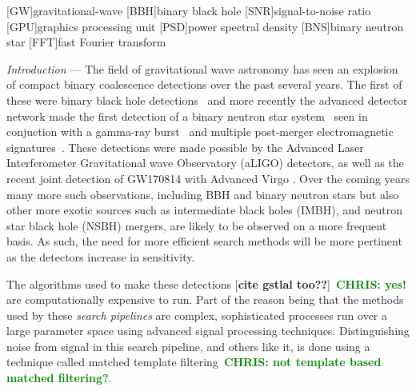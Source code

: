 \documentclass[%
 amsmath,amssymb,
 aps,
 twocolumn,
 prl,
 reprint,
floatfix,
]{revtex4-1}
\newcommand{\chris}[1]{\textbf{\textcolor{green}{CHRIS: #1}}}
\begin{document}
[GW]{gravitational-wave}
[BBH]{binary black hole}
[SNR]{signal-to-noise ratio}
[GPU]{graphics processing unit}
[PSD]{power spectral density}
[BNS]{binary neutron star}
[FFT]{fast Fourier transform}


%
%

%
%
\textit{Introduction} --- 
%
%
The field of gravitational wave astronomy has seen an explosion of compact
binary coalescence detections over the past several years. The first of these
were binary black hole detections~\cite{PhysRevLett.116.061102,
PhysRevLett.116.241103, PhysRevLett.118.221101} and more recently the advanced
detector network made the first detection of a binary neutron star
system~\cite{PhysRevLett.119.161101} seen in conjuction with a gamma-ray
burst~\cite{2017arXiv171005834L,2017arXiv171005446G,2017arXiv171005449S} and
multiple post-merger electromagnetic signatures~\cite{2017arXiv171005833L}.
These detections were made possible by the Advanced Laser Interferometer
Gravitational wave Observatory (aLIGO) detectors, as well as the recent joint
detection of GW170814 with Advanced Virgo \cite{PhysRevLett.119.141101}. Over
the coming years many more such observations, including \ac{BBH} and binary
neutron stars but also other more exotic sources such as intermediate black
holes (IMBH), and neutron star black hole (NSBH) mergers, are likely to be
observed on a more frequent basis. As such, the need for more efficient search
methods will be more pertinent as the detectors increase in sensitivity.

%
%
The algorithms used to make these detections \cite{0264-9381-33-21-215004}
[\textbf{cite gstlal too??}]~\chris{yes!} are computationally expensive to run.
Part of the reason being that the methods used by these \textit{search
pipelines} are complex, sophisticated processes run over a large parameter
space using advanced signal processing techniques. Distinguishing noise from
signal in this search pipeline, and others like it, is done using a technique
called matched template filtering~\chris{not template based matched
filtering?}. 
\end{document}
